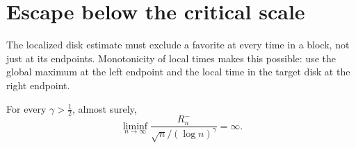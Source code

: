 \section{Escape below the critical scale}\label{sec:escape}
The localized disk estimate must exclude a favorite at every time in a block,
not just at its endpoints. Monotonicity of local times makes this possible:
use the global maximum at the left endpoint and the local time in the target
disk at the right endpoint.

\begin{proposition}\label{prop:supercritical-escape}
For every \(\gamma>\tfrac12\), almost surely,
\begin{equation}
\liminf_{n\to\infty}
       \frac{R_n^-}{\sqrt n/(\log n)^\gamma}=\infty.          \tag{80}
\end{equation}
\end{proposition}

